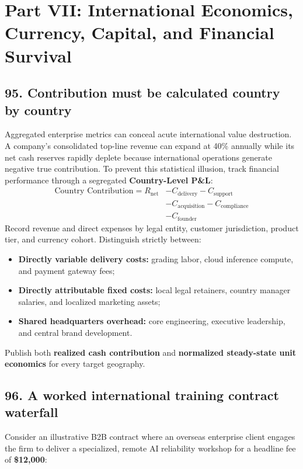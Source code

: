 \section{Part VII: International Economics, Currency, Capital, and Financial Survival}

\subsection{95. Contribution must be calculated country by country}

Aggregated enterprise metrics can conceal acute international value destruction. A company's consolidated top-line revenue can expand at 40\% annually while its net cash reserves rapidly deplete because international operations generate negative true contribution. To prevent this statistical illusion, track financial performance through a segregated \textbf{Country-Level P\&L}:
\begin{equation}
\begin{aligned}
\text{Country Contribution} = R_{\text{net}} &- C_{\text{delivery}} - C_{\text{support}} \\
&- C_{\text{acquisition}} - C_{\text{compliance}} \\
&- C_{\text{founder}}
\end{aligned}
\end{equation}
Record revenue and direct expenses by legal entity, customer jurisdiction, product tier, and currency cohort. Distinguish strictly between:
\begin{itemize}
    \item \textbf{Directly variable delivery costs:} grading labor, cloud inference compute, and payment gateway fees;
    \item \textbf{Directly attributable fixed costs:} local legal retainers, country manager salaries, and localized marketing assets;
    \item \textbf{Shared headquarters overhead:} core engineering, executive leadership, and central brand development.
\end{itemize}
Publish both \textbf{realized cash contribution} and \textbf{normalized steady-state unit economics} for every target geography.

\subsection{96. A worked international training contract waterfall}

Consider an illustrative B2B contract where an overseas enterprise client engages the firm to deliver a specialized, remote AI reliability workshop for a headline fee of \textbf{\$12,000}:

